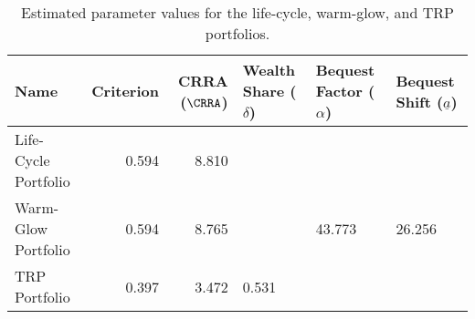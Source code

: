 \begin{table}\centering
    \begin{tabular}{lrrlll}
        \toprule
        Name                 & Criterion & CRRA ($\CRRA$) & Wealth Share ($\delta$) & Bequest Factor ($\alpha$) & Bequest Shift ($\underline{a}$) \\
        \midrule
        Life-Cycle Portfolio & 0.594     & 8.810          &                         &                           &                                 \\
        Warm-Glow Portfolio  & 0.594     & 8.765          &                         & 43.773                    & 26.256                          \\
        TRP Portfolio        & 0.397     & 3.472          & 0.531                   &                           &                                 \\
        \bottomrule
    \end{tabular}
    \caption{Estimated parameter values for the life-cycle, warm-glow, and TRP portfolios.}
    \label{parameters}
\end{table}